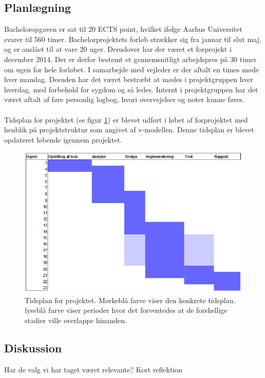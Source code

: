 \documentclass[rapport.tex]{subfiles}
\begin{document}
	\subsection{Planlægning}
	Bacheloropgaven er sat til 20 ECTS point, hvilket ifølge Aarhus Universitet svarer til 560 timer. Bachelorprojektets forløb strækker sig fra januar til slut maj, og er anslået til at vare 20 uger. Derudover har der været et forprojekt i december 2014. Der er derfor bestemt et gennemsnitligt arbejdspres på 30 timer om ugen for hele forløbet. I samarbejde med vejleder er der aftalt en times møde hver mandag. Desuden har det været bestræbt at mødes i projektgruppen hver hverdag, med forbehold for sygdom og så ledes. Internt i projektgruppen har det været aftalt af føre personlig logbog, hvori overvejelser og noter kunne føres. \\
	\\
	Tidsplan for projektet (se figur \ref{fig:Tidsplan}) er blevet udført i løbet af forprojektet med henblik på projektstruktur som angivet af v-modellen. Denne tidsplan er blevet opdateret løbende igennem projektet. 
	
	\begin{figure}
	\centering
	\includegraphics[width=0.9\linewidth]{Tidsplan}
	\caption{Tidsplan for projektet. Mørkeblå farve viser den konkrete tidsplan. lyseblå farve viser perioder hvor det forventedes at de forskellige stadier ville overlappe hinanden.}
	\label{fig:Tidsplan}
	\end{figure}
	
	\subsection{Diskussion}
	Har de valg vi har taget været relevante? Kort reflektion
		
\end{document}
